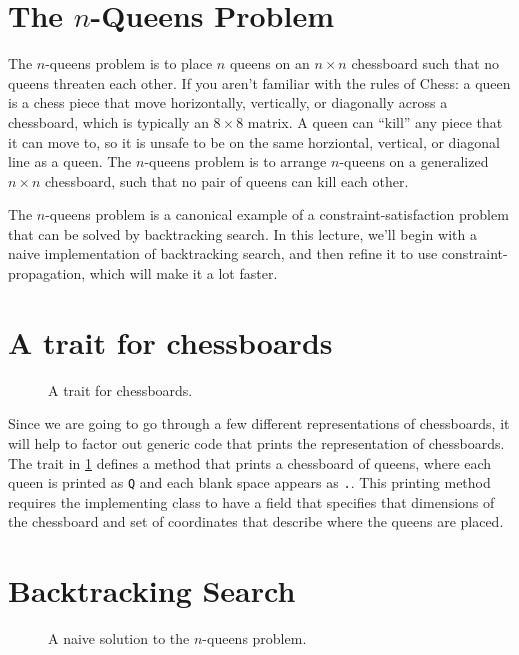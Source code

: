 \section{The $n$-Queens Problem}

The $n$-queens problem is to place $n$ queens on an $n \times n$ chessboard
such that no queens threaten each other.
If you aren't familiar with the
rules of Chess: a queen is a chess piece that move horizontally, vertically,
or diagonally across a chessboard, which is typically an $8 \times 8$ matrix.
A queen can ``kill'' any piece that it can move to, so it is unsafe to be
on the same horziontal, vertical, or diagonal line as a queen. The $n$-queens
problem is to arrange $n$-queens on a generalized $n \times n$ chessboard,
such that no pair of queens can kill each other.

The $n$-queens problem is a canonical example of a constraint-satisfaction
problem that can be solved by backtracking search. In this lecture, we'll
begin with a naive implementation of backtracking search, and then refine
it to use constraint-propagation, which will make it a lot faster.

\section{A trait for chessboards}

\begin{figure}
\caption{A trait for chessboards.}
\label{ChessBoardLike}
\end{figure}

Since we are going to go through a few different representations of chessboards,
it will help to factor out generic code that prints the representation of
chessboards. The  trait in \cref{ChessBoardLike}
defines a  method that prints a chessboard of queens,
where each queen is printed as \texttt{Q} and each blank space appears as
\texttt{.}. This printing method requires the implementing class to have
a field that specifies that dimensions of the chessboard and set of coordinates
that describe where the queens are placed.

\section{Backtracking Search}

\begin{figure}
\caption{A naive solution to the $n$-queens problem.}
\label{NaiveQueens}
\end{figure}

